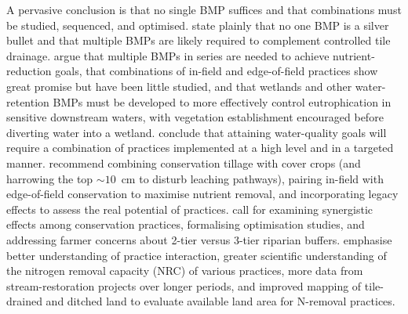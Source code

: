 A pervasive conclusion is that no single BMP suffices and that combinations must be studied, sequenced, and optimised. \textcite{Sunohara2016} state plainly that no one BMP is a silver bullet and that multiple BMPs are likely required to complement controlled tile drainage. \textcite{Lenhart2016} argue that multiple BMPs in series are needed to achieve nutrient-reduction goals, that combinations of in-field and edge-of-field practices show great promise but have been little studied, and that wetlands and other water-retention BMPs must be developed to more effectively control eutrophication in sensitive downstream waters, with vegetation establishment encouraged before diverting water into a wetland. \textcite{Christianson2014} conclude that attaining water-quality goals will require a combination of practices implemented at a high level and in a targeted manner. \textcite{Makhtoumi2025} recommend combining conservation tillage with cover crops (and harrowing the top ${\sim}10$~cm to disturb leaching pathways), pairing in-field with edge-of-field conservation to maximise nutrient removal, and incorporating legacy effects to assess the real potential of practices. \textcite{Kreig2019} call for examining synergistic effects among conservation practices, formalising optimisation studies, and addressing farmer concerns about 2-tier versus 3-tier riparian buffers. \textcite{McLellan2015} emphasise better understanding of practice interaction, greater scientific understanding of the nitrogen removal capacity (NRC) of various practices, more data from stream-restoration projects over longer periods, and improved mapping of tile-drained and ditched land to evaluate available land area for N-removal practices.

